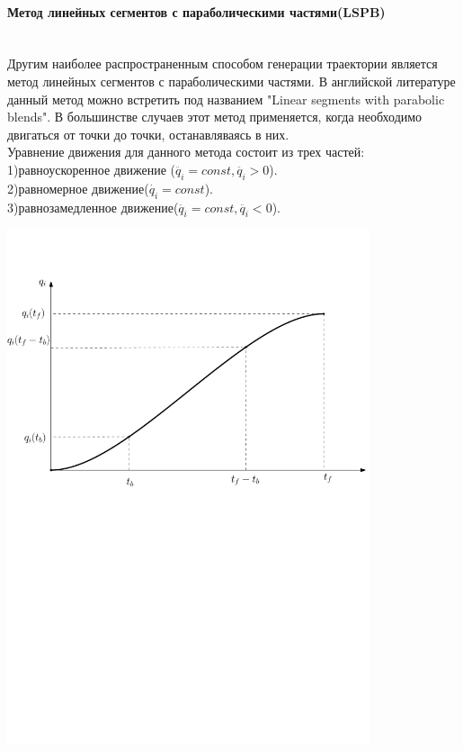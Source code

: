 \paragraph*{Метод линейных сегментов с параболическими частями(LSPB)}$\phantom{-}$\\

Другим наиболее распространенным способом генерации траектории является метод линейных сегментов с параболическими частями. В английской литературе данный метод можно встретить под названием  "Linear segments with parabolic blends". В большинстве случаев этот метод применяется, когда необходимо двигаться от точки до точки, останавляваясь в них.\\

Уравнение движения для данного метода состоит из трех частей:\\ 1)равноускоренное движение ($\ddot{q_i}=const,\ddot{q_i}>0$).\\
2)равномерное движение($\dot{q_i}=const$).\\
3)равнозамедленное движение($\ddot{q_i}=const,\ddot{q_i}<0$).\\

\begin{center}
    \includegraphics[width=0.8\textwidth]{Lab4/images/LSPB.pdf}\\
\end{center}

